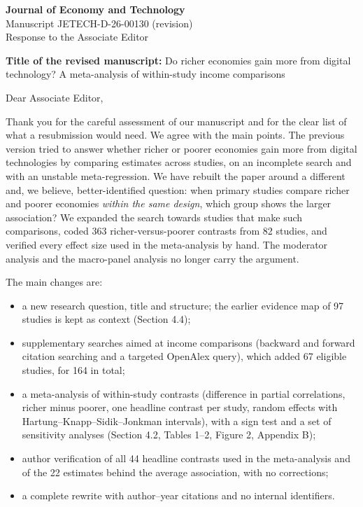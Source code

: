 \documentclass[11pt,a4paper]{article}
\begin{document}
\noindent\textbf{Journal of Economy and Technology}\\
Manuscript JETECH-D-26-00130 (revision)\\
Response to the Associate Editor

\medskip
\noindent\textbf{Title of the revised manuscript:} Do richer economies gain more from digital technology? A meta-analysis of within-study income comparisons

\medskip
Dear Associate Editor,

Thank you for the careful assessment of our manuscript and for the clear list of what a resubmission would need. We agree with the main points. The previous version tried to answer whether richer or poorer economies gain more from digital technologies by comparing estimates across studies, on an incomplete search and with an unstable meta-regression. We have rebuilt the paper around a different and, we believe, better-identified question: when primary studies compare richer and poorer economies \emph{within the same design}, which group shows the larger association? We expanded the search towards studies that make such comparisons, coded 363 richer-versus-poorer contrasts from 82 studies, and verified every effect size used in the meta-analysis by hand. The moderator analysis and the macro-panel analysis no longer carry the argument.

The main changes are:
\begin{itemize}[leftmargin=1.4em,itemsep=2pt]
\item a new research question, title and structure; the earlier evidence map of 97 studies is kept as context (Section 4.4);
\item supplementary searches aimed at income comparisons (backward and forward citation searching and a targeted OpenAlex query), which added 67 eligible studies, for 164 in total;
\item a meta-analysis of within-study contrasts (difference in partial correlations, richer minus poorer, one headline contrast per study, random effects with Hartung--Knapp--Sidik--Jonkman intervals), with a sign test and a set of sensitivity analyses (Section 4.2, Tables 1--2, Figure 2, Appendix B);
\item author verification of all 44 headline contrasts used in the meta-analysis and of the 22 estimates behind the average association, with no corrections;
\item a complete rewrite with author--year citations and no internal identifiers.
\end{itemize}
\end{document}
